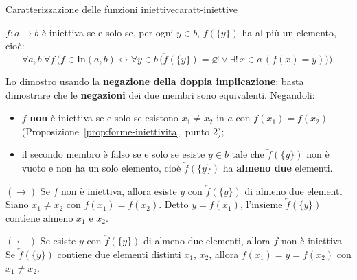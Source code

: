 
\begin{concetto}
\begin{Teorema}{Caratterizzazione delle funzioni iniettive}{caratt-iniettive}
    \begin{prerequisiti}
    \end{prerequisiti}
    $f \colon a \to b$ è iniettiva se e solo se, per ogni $y \in b$, $\overleftarrow{f}(\{y\})$ ha al più un elemento, cioè:
    \[ \forall a, b\ \forall f\,\Big(f \in \mathrm{In}(a, b) \leftrightarrow \forall y \in b\,\big(\overleftarrow{f}(\{y\}) = \varnothing \vee \exists!\, x \in a\,(f(x) = y)\big)\Big). \]
\end{Teorema}
\begin{dimostrazione}
    Lo dimostro usando la \textbf{negazione della doppia implicazione}: basta dimostrare che le \textbf{negazioni} dei due
    membri sono equivalenti. Negandoli:
    \begin{itemize}
        \item $f$ \textbf{non} è iniettiva se e solo se esistono $x_1 \neq x_2$ in $a$ con $f(x_1) = f(x_2)$
              (Proposizione~\ref{prop:forme-iniettivita}, punto 2);
        \item il secondo membro è falso se e solo se esiste $y \in b$ tale che $\overleftarrow{f}(\{y\})$ non è vuoto e non ha
              un solo elemento, cioè $\overleftarrow{f}(\{y\})$ ha \textbf{almeno due} elementi.
    \end{itemize}
    \begin{caso}{$(\rightarrow)$ Se $f$ non è iniettiva, allora esiste $y$ con $\overleftarrow{f}(\{y\})$ di almeno due elementi}
        Siano $x_1 \neq x_2$ con $f(x_1) = f(x_2)$. Detto $y = f(x_1)$, l'insieme $\overleftarrow{f}(\{y\})$ contiene almeno $x_1$ e $x_2$.
    \end{caso}
    \begin{caso}{$(\leftarrow)$ Se esiste $y$ con $\overleftarrow{f}(\{y\})$ di almeno due elementi, allora $f$ non è iniettiva}
        Se $\overleftarrow{f}(\{y\})$ contiene due elementi distinti $x_1$, $x_2$, allora $f(x_1) = y = f(x_2)$ con $x_1 \neq x_2$.
    \end{caso}
\end{dimostrazione}
\end{concetto}

